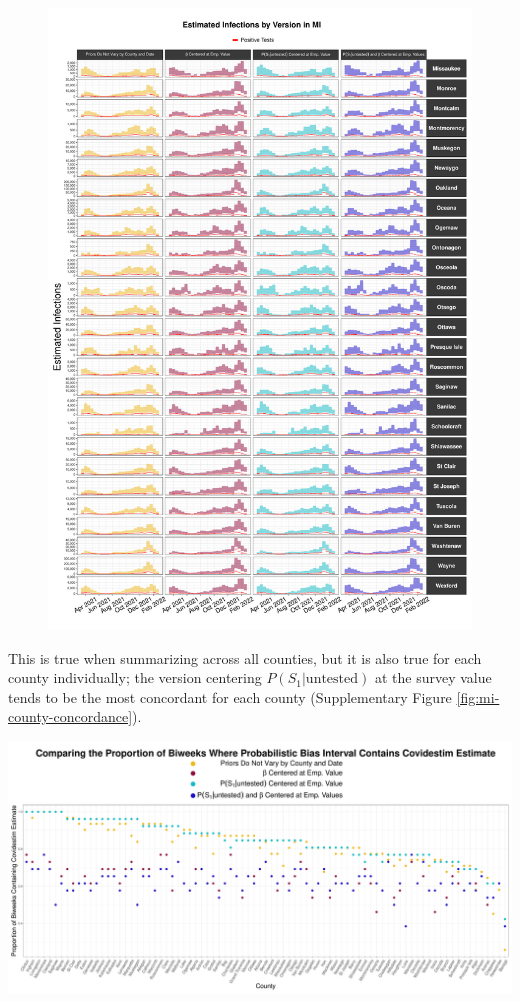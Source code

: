 \documentclass[12pt,twoside]{smiththesis}
\begin{document}
\begin{figure}
\includegraphics[width=1\linewidth]{figure/mi3_pb_compared_to_observed} \caption{\label{fig:pb_versions_mi}}\label{fig:unnamed-chunk-25-3}
\end{figure}
This is true when summarizing across all counties, but it is also true for each county individually; the version centering \(P(S_1|\text{untested})\) at the survey value tends to be the most concordant for each county (Supplementary Figure \ref{fig:mi-county-concordance}).

\includegraphics[width=1\linewidth]{figure/mi_pb_compared_to_covidestim_proportions}
\end{document}
